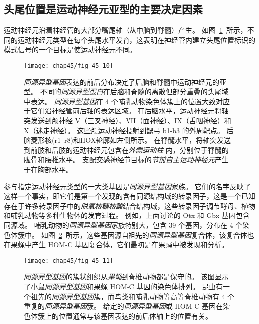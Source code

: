 \subsection{头尾位置是运动神经元亚型的主要决定因素}

运动神经元沿着神经管的大部分嘴尾轴（从中脑到脊髓）产生。
如图~\ref{fig:45_10}~所示，不同的运动神经元类型在每个头尾水平发育，这表明在神经管内建立头尾位置标识的模式信号的一个目标是使运动神经元不同。


\begin{figure}[htbp]
	\centering
	\texttt{[image: chap45/fig\_45\_10]}
	\caption{\textit{同源异型基因}表达的前后分布决定了后脑和脊髓中运动神经元的亚型。
		不同的\textit{同源异型蛋白}在后脑和脊髓的离散但部分重叠的头尾域中表达。
		\textit{同源异型基因}在 4 个哺乳动物染色体簇上的位置大致对应于它们沿神经管前后轴的表达区域。
		在后脑水平，运动神经元将轴突发送到颅神经 V（三叉神经）、VII（面神经）、IX（舌咽神经）和 X（迷走神经）。
		这些颅运动神经投射到鳃弓 b1-b3 的外周靶点。
		后脑菱形核(r1–r8)和HOX轮廓如左侧所示。
		在脊髓水平，将轴突发送到前肢和后肢的运动神经元包含在\textit{外侧运动柱} 内，分别位于脊髓的肱骨和腰椎水平。
		支配交感神经节目标的\textit{节前自主运动神经元}产生于在胸部水平\cite{kiecker2005compartments}。 }
	\label{fig:45_10}
\end{figure}


参与指定运动神经元类型的一大类基因是\textit{同源异型基因}家族。
它们的名字反映了这样一个事实，即它们是第一个发现的含有同源结构域的转录因子，这是一个已知存在于许多转录因子中的\textit{脱氧核糖核酸}结合结构域，这些转录因子调节酵母、植物和哺乳动物等多种生物体的发育过程。
例如，上面讨论的 Otx 和 Gbx 基因包含同源域。
哺乳动物的\textit{同源异型基因}家族特别大，包含 39 个基因，分布在 4 个染色体簇中。
如图~\ref{fig:45_11}~所示，这些基因源自祖先的\textit{同源异型基因}复合体，该复合体也在果蝇中产生 HOM-C 基因复合体，它们最初是在果蝇中被发现和分析。


\begin{figure}[htbp]
	\centering
	\texttt{[image: chap45/fig\_45\_11]}
	\caption{\textit{同源异型基因}的簇状组织从\textit{果蝇}到脊椎动物都是保守的。
		该图显示了小鼠\textit{同源异型基因}和果蝇 HOM-C 基因的染色体排列。
		昆虫有一个祖先的\textit{同源异型基因}簇，而鸟类和哺乳动物等高等脊椎动物有 4 个重复的\textit{同源异型基因}簇。
		给定的\textit{同源异型基因}或 HOM-C 基因在染色体簇上的位置通常与该基因表达的前后体轴上的位置有关\cite{wolpert2015principles}。 }
	\label{fig:45_11}
\end{figure}


